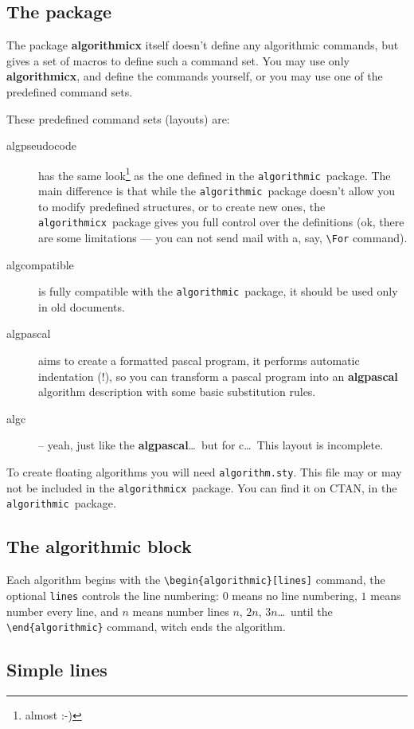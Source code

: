 \documentclass{article}
\newcommand{\alg}{\texttt{algorithmicx}}
\newcommand{\old}{\texttt{algorithmic}}
\begin{document}
\subsection{The package}
The package \textbf{algorithmicx} itself doesn't define any algorithmic commands, but gives 
a set of macros to define such a command set. You may use only \textbf{algorithmicx}, and define 
the commands yourself, or you may use one of the predefined command sets.

These predefined command sets (layouts) are:
\begin{description}
\item[algpseudocode] has the same look\footnote{almost :-)} as the one defined in the
\old\ package. The main difference is that while the \old\ package doesn't 
allow you to modify predefined structures, or to create new ones, the \alg\ 
package gives you full control over the definitions (ok, there are some 
limitations --- you can not send mail with a, say, \verb:\For: command).
\item[algcompatible] is fully compatible with the \old\ package, it should be
used only in old documents.
\item[algpascal] aims to create a formatted pascal program, it performs 
automatic indentation (!), so you can transform a pascal program into an 
\textbf{algpascal} algorithm description with some basic substitution rules.
\item[algc] -- yeah, just like the \textbf{algpascal}\dots\ but for c\dots\ 
This layout is incomplete.
\end{description}

To create floating algorithms you will need \verb:algorithm.sty:. This file may or may not be
included in the \alg\ package. You can find it on CTAN, in the \old\ package.

\subsection{The algorithmic block}
Each algorithm begins with the \verb:\begin{algorithmic}[lines]: command, the 
optional \verb:lines: controls the line numbering: $0$ means no line numbering, 
$1$ means number every line, and $n$ means number lines $n$, $2n$, $3n$\dots\ until the
\verb:\end{algorithmic}: command, witch ends the algorithm.

\subsection{Simple lines}
\end{document}
